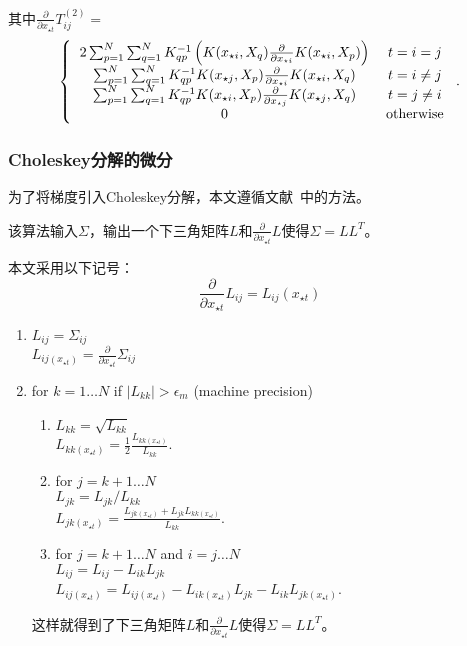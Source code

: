 \documentclass[index]{subfiles}
\begin{document}
其中$\frac{\partial}{\partial x_{\star t}} T^{(2)}_{ij} = $
\begin{equation}
    \left\{ \begin{tabular}{cc}
        $2 \sum_{p = 1}^{N} \sum_{q = 1}^{N} K^{-1}_{qp} \left( K(x_{\star i}, X_{q}) \frac{\partial}{\partial x_{\star i}} K(x_{\star i}, X_{p}) \right)$ & $t = i = j$ \\
        $\sum_{p = 1}^{N} \sum_{q = 1}^{N} K^{-1}_{qp} K(x_{\star j}, X_{p}) \frac{\partial}{\partial x_{\star i}} K(x_{\star i}, X_{q})$ & $t = i \neq j$ \\
							$\sum_{p = 1}^{N} \sum_{q = 1}^{N} K^{-1}_{qp} K(x_{\star i}, X_{p}) \frac{\partial}{\partial x_{\star j}} K(x_{\star j}, X_{q})$ & $t = j \neq i$ \\
							$0$ & otherwise
                                                      \end{tabular} \right..
\end{equation}

\subsubsection{Choleskey分解的微分}

为了将梯度引入Choleskey分解，本文遵循文献~中的方法。

该算法输入$\Sigma$，输出一个下三角矩阵$L$和$\frac{\partial}{\partial x_{\star t}} L$使得$\Sigma = LL^{T}$。

本文采用以下记号：
\begin{equation}
    \frac{\partial}{\partial x_{\star t}} L_{ij} = L_{ij} (x_{\star t})
\end{equation}
\begin{enumerate}
 \item $L_{ij} = \Sigma_{ij}$ \\
       $L_{ij (x_{\star t})} = \frac{\partial}{\partial x_{\star t}} \Sigma_{ij}$
 \item for $k = 1\ldots N$ if $|L_{kk}| > \epsilon_{m}$ (machine precision)
 \begin{enumerate}
  \item $L_{kk} = \sqrt{L_{kk}}$ \\
	$L_{kk (x_{\star t})} = \frac{1}{2} \frac{L_{kk (x_{\star t})}}{L_{kk}}$.
  \item for $j = k+1\ldots N$ \\
	$L_{jk} = L_{jk}/L_{kk}$ \\
	$L_{jk (x_{\star t})} = \frac{L_{jk (x_{\star t})} + L_{jk}L_{kk (x_{\star t})}}{L_{kk}}$.
  \item for $j = k+1\ldots N$ and $i = j\ldots N$ \\
	$L_{ij} = L_{ij} - L_{ik}L_{jk}$ \\
	$L_{ij (x_{\star t})} = L_{ij (x_{\star t})} - L_{ik (x_{\star t})}L_{jk} - L_{ik}L_{jk (x_{\star t})}$.
 \end{enumerate}

这样就得到了下三角矩阵$L$和$\frac{\partial}{\partial x_{\star t}} L$使得$\Sigma = LL^{T}$。

\end{enumerate}
\end{document}
